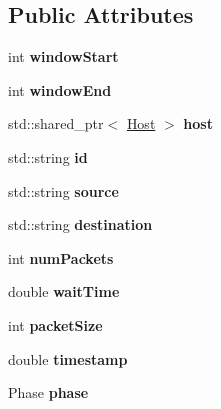 \subsection*{\-Public \-Attributes}
\begin{DoxyCompactItemize}
\item 
\hypertarget{classFlow_a1c04de60a81b02750673806906701a76}{int {\bfseries window\-Start}}\label{classFlow_a1c04de60a81b02750673806906701a76}

\item 
\hypertarget{classFlow_a8ffd0d6dd0bf1c2c2b97ac164890715f}{int {\bfseries window\-End}}\label{classFlow_a8ffd0d6dd0bf1c2c2b97ac164890715f}

\item 
\hypertarget{classFlow_af45cdc7b3609577eb08cb072e9631809}{std\-::shared\-\_\-ptr$<$ \hyperlink{classHost}{\-Host} $>$ {\bfseries host}}\label{classFlow_af45cdc7b3609577eb08cb072e9631809}

\item 
\hypertarget{classFlow_a8724a8f4ce94cf7bfb0db79e688ed179}{std\-::string {\bfseries id}}\label{classFlow_a8724a8f4ce94cf7bfb0db79e688ed179}

\item 
\hypertarget{classFlow_a36eb3e23b0804647c30be41835b790b3}{std\-::string {\bfseries source}}\label{classFlow_a36eb3e23b0804647c30be41835b790b3}

\item 
\hypertarget{classFlow_a536685c38def6cf8b61d0fb0d7e8372d}{std\-::string {\bfseries destination}}\label{classFlow_a536685c38def6cf8b61d0fb0d7e8372d}

\item 
\hypertarget{classFlow_a78d725176506b21ce2355b3742ab8c17}{int {\bfseries num\-Packets}}\label{classFlow_a78d725176506b21ce2355b3742ab8c17}

\item 
\hypertarget{classFlow_a47968d3d4596ad50ce090a0c352a89f5}{double {\bfseries wait\-Time}}\label{classFlow_a47968d3d4596ad50ce090a0c352a89f5}

\item 
\hypertarget{classFlow_ac5af37a8637ec606977ebc1e33a0c59b}{int {\bfseries packet\-Size}}\label{classFlow_ac5af37a8637ec606977ebc1e33a0c59b}

\item 
\hypertarget{classFlow_a502b4455d485a1a0325d21d246183bb1}{double {\bfseries timestamp}}\label{classFlow_a502b4455d485a1a0325d21d246183bb1}

\item 
\hypertarget{classFlow_a56615b49301aaddf4cab4fa3f878c5a7}{\-Phase {\bfseries phase}}\label{classFlow_a56615b49301aaddf4cab4fa3f878c5a7}


\end{DoxyCompactItemize}
